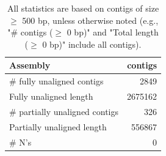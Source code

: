 \documentclass[12pt,a4paper]{article}
\begin{document}
\begin{table}[ht]
\begin{center}
\caption{All statistics are based on contigs of size $\geq$ 500 bp, unless otherwise noted (e.g., "\# contigs ($\geq$ 0 bp)" and "Total length ($\geq$ 0 bp)" include all contigs).}
\begin{tabular}{|l*{1}{|r}|}
\hline
Assembly & contigs \\ \hline
\# fully unaligned contigs & 2849 \\ \hline
Fully unaligned length & 2675162 \\ \hline
\# partially unaligned contigs & 326 \\ \hline
Partially unaligned length & 556867 \\ \hline
\# N's & 0 \\ \hline
\end{tabular}
\end{center}
\end{table}
\end{document}
